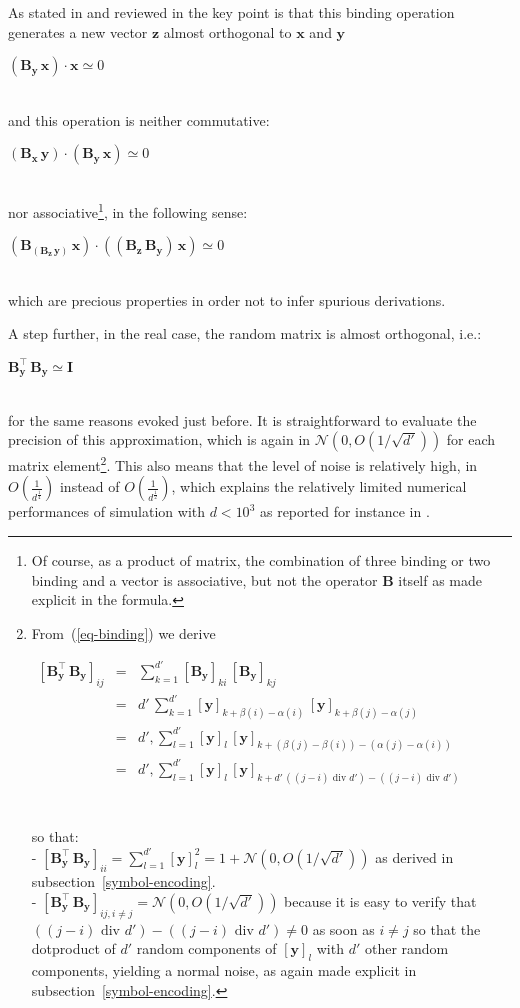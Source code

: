 \documentclass[sn-mathphys]{sn-jnl}
\newcommand{\eqline}[1]{~\vspace{0.1cm}\\\centerline{$#1$}\vspace{0.1cm}\\}
\begin{document}
\begin{appendices}
As stated in \cite{gosmann_vector-derived_2019} and reviewed in \cite{mercier_ontology_2021} the key point is that this binding operation generates a new vector $\mathbf{z}$ almost orthogonal to $\mathbf{x}$ and $\mathbf{y}$
\eqline{(\mathbf{B_y} \, \mathbf{x}) \cdot \mathbf{x} \simeq 0}
and this operation is neither commutative:
\eqline{(\mathbf{B_x} \, \mathbf{y}) \cdot (\mathbf{B_y} \, \mathbf{x}) \simeq 0}
nor associative\footnote{Of course, as a product of matrix, the combination of three binding or two binding and a vector is associative, but not the operator $\mathbf{B}$ itself as made explicit in the formula.}, in the following sense:
\eqline{(\mathbf{B_{(B_z \, y)}} \, \mathbf{x}) \cdot ((\mathbf{B_z} \, \mathbf{B_y}) \, \mathbf{x}) \simeq 0}
which are precious properties in order not to infer spurious derivations.

A step further, in the real case, the random matrix is almost orthogonal, i.e.:
\eqline{\mathbf{B_y^\top} \, \mathbf{B_y} \simeq \mathbf{I}}
for the same reasons evoked just before. It is straightforward to evaluate the precision of this approximation, which is again in ${\mathcal N}(0, O(1/\sqrt{d'}))$ for each matrix element\footnote{From~(\ref{eq-binding}) we derive
\eqline{\begin{array}{rcl}
    \left[\mathbf{B_y^\top} \, \mathbf{B_y}\right]_{ij}
    &=& \sum_{k = 1}^{d'} [\mathbf{B_y}]_{ki} \, [\mathbf{B_y}]_{kj} \\
    &=& d' \, \sum_{k = 1}^{d'} [\mathbf{y}]_{k + \beta(i) - \alpha(i)} \, [\mathbf{y}]_{k + \beta(j) - \alpha(j)} \\
    &=& d' , \sum_{l = 1}^{d'} [\mathbf{y}]_l \, [\mathbf{y}]_{k + (\beta(j) - \beta(i)) - (\alpha(j) - \alpha(i))} \\
    &=& d' , \sum_{l = 1}^{d'} [\mathbf{y}]_l \, [\mathbf{y}]_{k + d' \, ((j - i) \mbox{ div } d') - ((j - i) \mbox{ div } d')} \\
\end{array}}
so that:
\\- $\left[\mathbf{B_y^\top} \, \mathbf{B_y}\right]_{ii} = \sum_{l = 1}^{d'} [\mathbf{y}]_l^2 = 1 + {\mathcal N}(0, O(1/\sqrt{d'}))$ as derived in subsection~\ref{symbol-encoding}.
\\- $\left[\mathbf{B_y^\top} \, \mathbf{B_y}\right]_{ij, i \ne j} = {\mathcal N}(0, O(1/\sqrt{d'}))$ because it is easy to verify that $((j - i) \mbox{ div } d') - ((j - i) \mbox{ div } d') \ne 0$ as soon as $i \ne j$ so that the dotproduct of $d'$ random components of $[\mathbf{y}]_l$ with $d'$ other random components, yielding a normal noise, as again made explicit in subsection~\ref{symbol-encoding}.}. This also means that the level of noise is relatively high, in $O\left(\frac{1}{d^{\frac{1}{4}}}\right)$ instead of $O\left(\frac{1}{d^{\frac{1}{2}}}\right)$, which explains the relatively limited numerical performances of simulation with $d< 10^3$ as reported for instance in \cite{schlegel_comparison_2020}.



\end{appendices}
\end{document}
